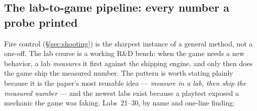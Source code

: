 \documentclass[10pt,twocolumn]{article}
\begin{document}
\subsection{The lab-to-game pipeline: every number a probe printed}
\label{sec:labs}

Fire control (\S\ref{sec:shooting}) is the sharpest instance of a general method, not a
one-off. The lab course is a working R\&D bench: when the game needs a new behavior, a lab
\emph{measures} it first against the shipping engine, and only then does the game ship the
measured number. The pattern is worth stating plainly because it is the paper's most
reusable idea --- \emph{measure in a lab, then ship the measured number} --- and the newest
labs exist because a playtest exposed a mechanic the game was faking. Labs~21--30, by name
and one-line finding:
\end{document}
